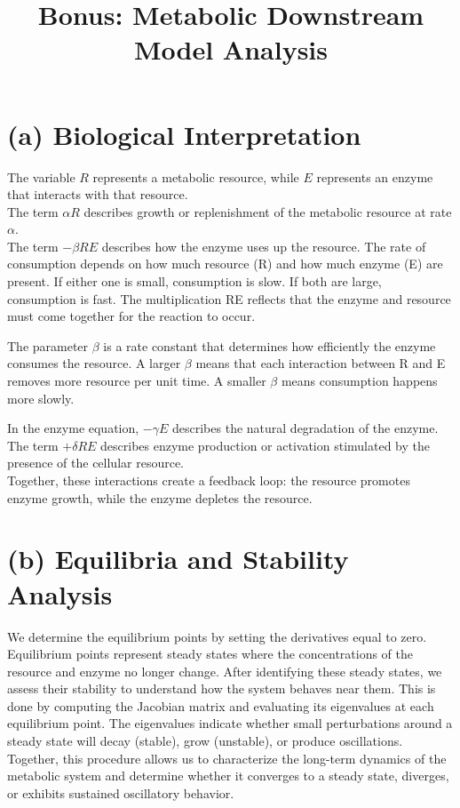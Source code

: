 \documentclass[12pt]{article}
\title{Bonus: Metabolic Downstream Model Analysis}
\author{}
\date{}
\begin{document}
\maketitle

\section*{(a) Biological Interpretation}

The variable $R$ represents a metabolic resource, while $E$ represents an enzyme that interacts with that resource.\\
The term $\alpha R$ describes growth or replenishment of the metabolic resource at rate $\alpha$.\\
The term $-\beta R E$ describes how the enzyme uses up the resource. The rate of consumption depends on how much resource (R) and how much enzyme (E) are present. If either one is small, consumption is slow. If both are large, consumption is fast. The multiplication RE reflects that the enzyme and resource must come together for the reaction to occur.

The parameter $\beta$ is a rate constant that determines how efficiently the enzyme consumes the resource. A larger $\beta$ means that each interaction between R and E removes more resource per unit time. A smaller $\beta$ means consumption happens more slowly.

In the enzyme equation, $-\gamma E$ describes the natural degradation of the enzyme.\\
The term $+\delta R E$ describes enzyme production or activation stimulated by the presence of the cellular resource.\\

Together, these interactions create a feedback loop: the resource promotes enzyme growth, while the enzyme depletes the resource.

\section*{(b) Equilibria and Stability Analysis}
We determine the equilibrium points by setting the derivatives equal to zero. Equilibrium points represent steady states where the concentrations of the resource and enzyme no longer change. After identifying these steady states, we assess their stability to understand how the system behaves near them. This is done by computing the Jacobian matrix and evaluating its eigenvalues at each equilibrium point. The eigenvalues indicate whether small perturbations around a steady state will decay (stable), grow (unstable), or produce oscillations. Together, this procedure allows us to characterize the long-term dynamics of the metabolic system and determine whether it converges to a steady state, diverges, or exhibits sustained oscillatory behavior.
\end{document}
